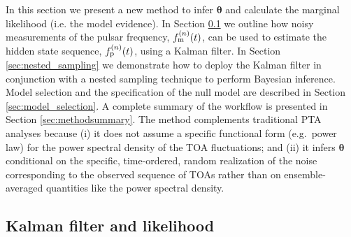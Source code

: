 \documentclass[fleqn,usenatbib,useAMS]{mnras}
\begin{document}
In this section we present a new method to infer $\boldsymbol{\theta}$ and calculate the marginal likelihood (i.e. the model evidence). In Section \ref{sec:kalman_filter} we outline how noisy measurements of the pulsar frequency, $f_{\rm m}^{(n)}(t)$, can be used to estimate the hidden state sequence, $f_{\rm p}^{(n)}(t)$, using a Kalman filter. In Section \ref{sec:nested_sampling} we demonstrate how to deploy the Kalman filter in conjunction with a nested sampling technique to perform Bayesian inference. Model selection and the specification of the null model are described in Section \ref{sec:model_selection}. A complete summary of the workflow is presented in Section \ref{sec:methodsummary}. The method complements traditional PTA analyses because (i) it does not assume a specific functional form (e.g.\ power law) for the power spectral density of the TOA fluctuations; and (ii) it infers ${\boldsymbol{\theta}}$ conditional on the specific, time-ordered, random realization of the noise corresponding to the observed sequence of TOAs rather than on ensemble-averaged quantities like the power spectral density.

\subsection{Kalman filter and likelihood}\label{sec:kalman_filter}
\end{document}
